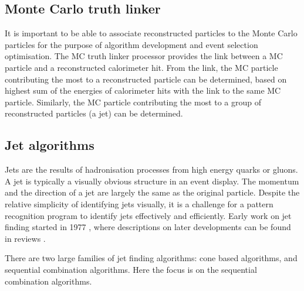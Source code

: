 
\subsection{Monte Carlo truth linker}
\label{sec:pandoraMCtruthLink}
It is important to be able to associate reconstructed particles to the Monte Carlo particles for the purpose of algorithm development and  event selection optimisation. The MC truth linker processor provides the link between a MC particle and a  reconstructed calorimeter hit. From the link, the MC particle contributing the most to a reconstructed particle  can be determined, based on highest sum of the energies of calorimeter hits with the link to the same MC particle. Similarly, the MC particle contributing the most to a group of reconstructed particles (a jet) can be determined.



\subsection{Jet algorithms}
\label{sec:pandoraJetAlg}


Jets are the results of hadronisation processes from high energy quarks or gluons. A jet is typically a visually obvious structure in an event display. The momentum and the direction of a jet are largely the same as the  original particle. Despite the relative simplicity of identifying jets visually, it is a challenge for a pattern recognition program to identify jets effectively and efficiently. Early work on jet finding started in 1977 \cite{Sterman:1977wj}, where descriptions on later developments can be found in reviews \cite{Moretti:1998qx,Salam:2009jx,Ali:2010tw}.

There are two large families of jet finding algorithms: cone based algorithms, and sequential combination algorithms. Here the focus is on the sequential combination algorithms.

